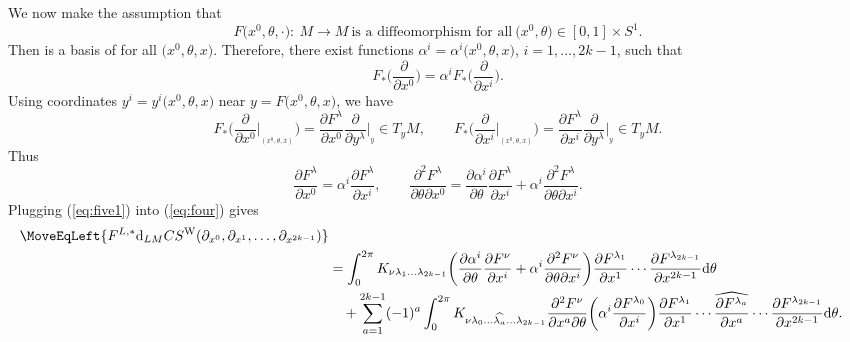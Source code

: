 \documentclass[10pt,a4paper]{amsart}
\numberwithin{equation}{section}
\theoremstyle{definition}
\newcommand{\bm}{ M}
\begin{document}
We now make the assumption that
\begin{equation}\label{eq:diff}
F\bigl(x^0, \theta,\cdot\bigr)\colon\ \bm\to\bm \ \text{is a diffeomorphism for all} \ \bigl(x^0,\theta\bigr)\in [0,1]\times S^1.
\end{equation}
Then  is a basis of {\smash{$T_{F(x^0,\theta,x)}\bm$}} for all $\bigl(x^0,\theta,x\bigr)$.
Therefore, there exist functions $\alpha^i =\alpha^i\bigl(x^0,\theta,x\bigr)$, $i = 1,\dots,2k-1$, such that
\begin{equation}\label{eq:five} F_*\biggl(\frac{\partial}{\partial x^0}\biggr) =
\alpha^iF_*\biggl(\frac{\partial}{\partial x^i}\biggr).
\end{equation}
Using coordinates $y^i = y^i\bigl(x^0,\theta, x\bigr)$ near $y = F\bigl(x^0,\theta,x\bigr)$, we have
\[F_*\biggl(\frac{\partial}{\partial x^0}\biggl|_{_{(x^0, \theta,x)}}\biggr) = \frac{\partial F^\lambda}{\partial x^0} \frac{\partial}{\partial y^\lambda}\biggl|_{_{y}} \in T_y\bm,\qquad
F_*\biggl(\frac{\partial}{\partial x^i}\biggl|_{_{(x^0, \theta,x)}}\biggr) = \frac{\partial F^\lambda}{\partial x^i} \frac{\partial}{\partial y^\lambda}\biggl|_{_{y}} \in T_y\bm.\]
Thus
\begin{equation}\label{eq:five1}
\frac{\partial F^\lambda}{\partial x^0} = \alpha^i\frac{\partial F^\lambda}{\partial x^i},\qquad
\frac{\partial^2 F^\lambda}{\partial\theta \partial x^0} =
\frac{\partial \alpha^i}{\partial\theta} \frac{\partial F^\lambda}{\partial x^i}
+ \alpha^i\frac{\partial^2 F^\lambda}{\partial\theta \partial x^i}.
\end{equation}
Plugging (\ref{eq:five1}) into (\ref{eq:four}) gives
\begin{align*}%
\MoveEqLeft{F^{L,*} {\rm d}_{L{\bm}} CS^{\rm W}
(\partial_{x^0}, \partial_{x^1},
\dots, \partial_{x^{2k-1}})}\nonumber\\
&=
 \int_0^{2\pi} K_{\nu \lambda_1 \dots \lambda_{2k-1}}
\biggl( \frac{\partial \alpha^i}{\partial\theta} \frac{\partial F^\nu}{\partial x^i}
+ \alpha^i\frac{\partial^2 F^\nu}{\partial\theta \partial x^i}\biggr)
\frac{\partial F^{\lambda_1}}{\partial x^1}
\cdots
\frac{\partial F^{\lambda_{2k-1}}}{\partial x^{2k-1}}
 {\rm d}\theta\\
&\quad +\sum_{a=1}^{2k-1}
(-1)^a
\int_0^{2\pi}
K_{\nu \lambda_0 \dots \widehat{\lambda_a} \dots \lambda_{2k-1}}
\frac{\partial^2 F^\nu}{\partial x^a \partial \theta} \biggl( \alpha^i\frac{\partial F^{\lambda_0}}{\partial x^i}
\biggr) \frac{\partial F^{\lambda_1}}{\partial x^1}
\cdots
\widehat{\frac{\partial F^{\lambda_a}}{\partial x^a}}
\cdots
\frac{\partial F^{\lambda_{2k-1}}}{\partial x^{2k-1}}
 {\rm d}\theta. \nonumber
\end{align*}
\end{document}
